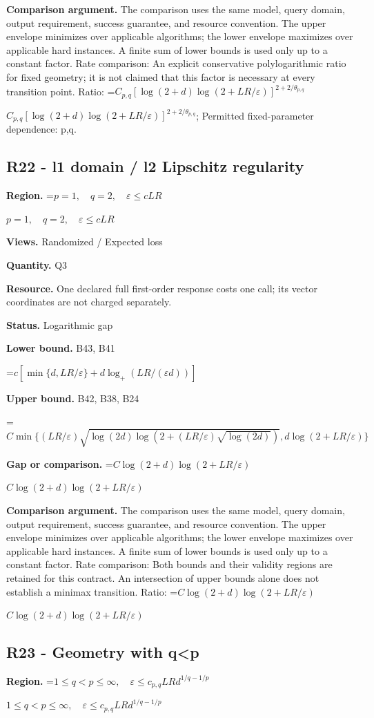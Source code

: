 \documentclass[10pt,a4paper]{article}
\newcommand{\AtlasMath}[1]{\par\begingroup\centering\setbox0=\hbox{$\displaystyle #1$}\ifdim\wd0>1.4\linewidth\typeout{ATLAS WIDE FORMULA: \the\wd0}\fi\ifdim\wd0>\linewidth\resizebox{\linewidth}{!}{\box0}\else\box0\fi\par\endgroup}
\newcommand{\AtlasInlineMath}[1]{\begingroup\setbox0=\hbox{$#1$}\ifdim\wd0>.4\linewidth\endgroup\AtlasMath{#1}\else\endgroup$#1$\fi}
\begin{document}
\textbf{Comparison argument.} The comparison uses the same model, query domain, output requirement, success guarantee, and resource convention. The upper envelope minimizes over applicable algorithms; the lower envelope maximizes over applicable hard instances. A finite sum of lower bounds is used only up to a constant factor. Rate comparison: An explicit conservative polylogarithmic ratio for fixed geometry; it is not claimed that this factor is necessary at every transition point. Ratio: \AtlasInlineMath{C_{p,q}[\log(2+d)\log(2+LR/\varepsilon)]^{2+2/\theta_{p,q}}}; Permitted fixed-parameter dependence: p,q.

\subsection{R22 - l1 domain / l2 Lipschitz regularity}
\textbf{Region.} \AtlasInlineMath{p=1,\quad q=2,\quad\varepsilon\le cLR}

\textbf{Views.} Randomized / Expected loss

\textbf{Quantity.} Q3

\textbf{Resource.} One declared full first-order response costs one call; its vector coordinates are not charged separately.

\textbf{Status.} Logarithmic gap

\textbf{Lower bound.} B43, B41

\AtlasMath{c[\min\{d,LR/\varepsilon\}+d\log_+(LR/(\varepsilon d))]}
\textbf{Upper bound.} B42, B38, B24

\AtlasMath{C\min\{(LR/\varepsilon)\sqrt{\log(2d)\log(2+(LR/\varepsilon)\sqrt{\log(2d)})},d\log(2+LR/\varepsilon)\}}
\textbf{Gap or comparison.} \AtlasInlineMath{C\log(2+d)\log(2+LR/\varepsilon)}

\textbf{Comparison argument.} The comparison uses the same model, query domain, output requirement, success guarantee, and resource convention. The upper envelope minimizes over applicable algorithms; the lower envelope maximizes over applicable hard instances. A finite sum of lower bounds is used only up to a constant factor. Rate comparison: Both bounds and their validity regions are retained for this contract. An intersection of upper bounds alone does not establish a minimax transition. Ratio: \AtlasInlineMath{C\log(2+d)\log(2+LR/\varepsilon)}

\subsection{R23 - Geometry with q<p}
\textbf{Region.} \AtlasInlineMath{1\le q<p\le\infty,\quad\varepsilon\le c_{p,q}LRd^{1/q-1/p}}
\end{document}
